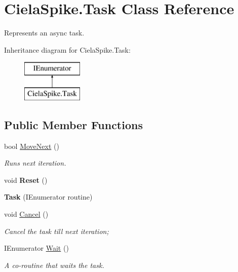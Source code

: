 \hypertarget{class_ciela_spike_1_1_task}{}\section{Ciela\+Spike.\+Task Class Reference}
\label{class_ciela_spike_1_1_task}


Represents an async task.  


Inheritance diagram for Ciela\+Spike.\+Task\+:\begin{figure}[H]
\begin{center}
\leavevmode
\includegraphics[height=2.000000cm]{class_ciela_spike_1_1_task}
\end{center}
\end{figure}
\subsection*{Public Member Functions}
\begin{DoxyCompactItemize}
\item 
bool \hyperlink{class_ciela_spike_1_1_task_a7aa5e9ac9431e14540db93eadbbedd3f}{Move\+Next} ()
\begin{DoxyCompactList}\small\item\em Runs next iteration. \end{DoxyCompactList}\item 
void {\bfseries Reset} ()\hypertarget{class_ciela_spike_1_1_task_abaa2e386621a8490e72f325d7a29920b}{}\label{class_ciela_spike_1_1_task_abaa2e386621a8490e72f325d7a29920b}

\item 
{\bfseries Task} (I\+Enumerator routine)\hypertarget{class_ciela_spike_1_1_task_a93dd2db76a6f8476fa1bdf4698827df6}{}\label{class_ciela_spike_1_1_task_a93dd2db76a6f8476fa1bdf4698827df6}

\item 
void \hyperlink{class_ciela_spike_1_1_task_a441c75316841dbb5efef5902410d77d9}{Cancel} ()
\begin{DoxyCompactList}\small\item\em Cancel the task till next iteration; \end{DoxyCompactList}\item 
I\+Enumerator \hyperlink{class_ciela_spike_1_1_task_aabec45633d71b685190331089f612392}{Wait} ()
\begin{DoxyCompactList}\small\item\em A co-\/routine that waits the task. \end{DoxyCompactList}\end{DoxyCompactItemize}
